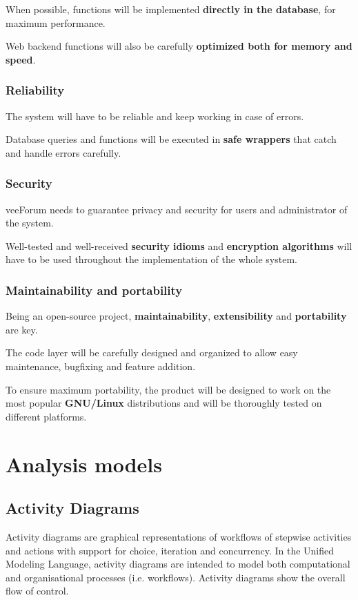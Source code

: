 \documentclass[12pt]{report}
\renewcommand\emph{\textbf}
\begin{document}
                        When possible, functions will be implemented \emph{directly in the database}, for maximum performance.

                        Web backend functions will also be carefully \emph{optimized both for memory and speed}.

                    \subsubsection{Reliability}
                        The system will have to be reliable and keep working in case of errors.

                        Database queries and functions will be executed in \emph{safe wrappers} that catch and handle errors carefully.

                    \subsubsection{Security}
                        veeForum needs to guarantee privacy and security for users and administrator of the system.

                        Well-tested and well-received \emph{security idioms} and \emph{encryption algorithms} will have to be used throughout the implementation of the whole system.

                    \subsubsection{Maintainability and portability}
                        Being an open-source project, \emph{maintainability}, \emph{extensibility} and \emph{portability} are key.

                        The code layer will be carefully designed and organized to allow easy maintenance, bugfixing and feature addition.

                        To ensure maximum portability, the product will be designed to work on the most popular \emph{GNU/Linux} distributions and will be thoroughly tested on different platforms.
            
            \section{Analysis models}
                \subsection{Activity Diagrams}
                    Activity diagrams are graphical representations of workflows of stepwise activities and actions with support for choice, iteration and concurrency. 
                    In the Unified Modeling Language, activity diagrams are intended to model both computational and organisational processes (i.e. workflows). 
                    Activity diagrams show the overall flow of control.
\end{document}
